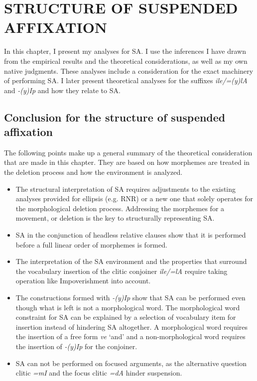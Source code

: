 \chapter{\MakeUppercase{structure of suspended affixation}}


In this chapter, I present my analyses for SA. I use the inferences I have drawn from the empirical results and the theoretical considerations, as well as my own native judgments. These analyses include a consideration for the exact machinery of performing SA. I later present theoretical analyses for the suffixes \textit{ile/=(y)lA} and \textit{-(y)Ip} and how they relate to SA.







% 

\section{Conclusion for the structure of suspended affixation}

The following points make up a general summary of the theoretical consideration that are made in this chapter. They are based on how morphemes are treated in the deletion process and how the environment is analyzed. 

\begin{itemize}
    \item The structural interpretation of SA requires adjustments to the existing analyses provided for ellipsis (e.g. RNR) or a new one that solely operates for the morphological deletion process. Addressing the morphemes for a movement, or deletion is the key to structurally representing SA.
    
    \item SA in the conjunction of headless relative clauses show that it is performed before a full linear order of morphemes is formed.
    
    \item The interpretation of the SA environment and the properties that surround the vocabulary insertion of the clitic conjoiner \textit{ile/=lA} require taking operation like Impoverishment into account.
    
    \item The constructions formed with \textit{-(y)Ip} show that SA can be performed even though what is left is not a morphological word. The morphological word constraint for SA can be explained by a selection of vocabulary item for insertion instead of hindering SA altogether. A morphological word requires the insertion of a free form \textit{ve} `and' and a non-morphological word requires the insertion of \textit{-(y)Ip} for the conjoiner. 
    
    \item SA can not be performed on focused arguments, as the alternative question clitic \textit{=mI} and the focus clitic \textit{=dA} hinder suspension.
\end{itemize}


